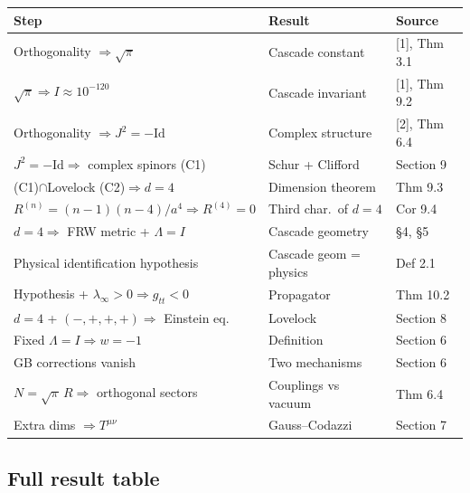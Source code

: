 \documentclass[12pt,a4paper]{article}
\begin{document}
\begin{center}
\small
\begin{tabular}{lll}
\hline
Step & Result & Source \\
\hline
Orthogonality $\Rightarrow \sqrt{\pi}$ & Cascade constant & [1], Thm 3.1 \\
$\sqrt{\pi} \Rightarrow I \approx 10^{-120}$ & Cascade invariant & [1], Thm 9.2 \\
Orthogonality $\Rightarrow J^2 = -\text{Id}$ & Complex structure & [2], Thm 6.4 \\
$J^2 = -\text{Id} \Rightarrow$ complex spinors (C1) & Schur + Clifford & Section 9 \\
(C1)$\cap$Lovelock (C2)$\Rightarrow d = 4$ & Dimension theorem & Thm 9.3 \\
$R^{(n)} = (n-1)(n-4)/a^4 \Rightarrow R^{(4)} = 0$ & Third char.\ of $d = 4$ & Cor 9.4 \\
$d = 4 \Rightarrow$ FRW metric + $\Lambda = I$ & Cascade geometry & \S4, \S5 \\
Physical identification hypothesis & Cascade geom = physics & Def 2.1 \\
Hypothesis + $\lambda_\infty > 0 \Rightarrow g_{tt} < 0$ & Propagator & Thm 10.2 \\
$d = 4$ + $(-,+,+,+) \Rightarrow$ Einstein eq. & Lovelock & Section 8 \\
Fixed $\Lambda = I \Rightarrow w = -1$ & Definition & Section 6 \\
GB corrections vanish & Two mechanisms & Section 6 \\
$N = \sqrt{\pi}\,R \Rightarrow$ orthogonal sectors & Couplings vs vacuum & Thm 6.4 \\
Extra dims $\Rightarrow T^{\mu\nu}$ & Gauss--Codazzi & Section 7 \\
\hline
\end{tabular}
\end{center}

\subsection{Full result table}
\end{document}
